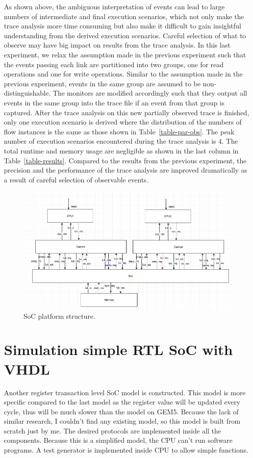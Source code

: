\documentclass[12pt,frontmatter,copyright,thesis]{usfmanus}
\begin{document}
As shown above, the ambiguous interpretation of events can lead to large numbers of intermediate and final execution scenarios, which not only make the trace analysis more time consuming but also make it difficult to gain insightful understanding from the derived execution scenarios.  Careful selection of what to observe may have big impact on results from the trace analysis.  In this last experiment, we relax the assumption made in the previous experiment such that the events passing each link are partitioned into two groups, one for read operations and one for write operations.  Similar to the assumption made in the previous experiment, events in the same group are assumed to be non-distinguishable.  The monitors are modified accordingly such that they output all events in the same group into the trace file if an event from that group is captured.  After the trace analysis on this new partially observed trace is finished, only one execution scenario is derived where the distribution of the numbers of flow instances is the same as those shown in Table~\ref{table-par-obs}.  The peak number of execution scenarios encountered during the trace analysis is $4$.  The total runtime and memory usage are negligible as shown in the last column in Table~\ref{table-results}.  Compared to the results from the previous experiment, the precision and the performance of the trace analysis are improved dramatically as a result of careful selection of observable events. 


\begin{figure} 
\centerline{
\includegraphics[width=7in]{struc.pdf}}
\caption{SoC platform structure.}
\label{rtlstruc}
\end{figure}


\section{Simulation simple RTL SoC with VHDL}
Another register transaction level SoC model is constructed. This model is more specific compared to the last model as the register value will be updated every cycle, thus will be much slower than the model on GEM5. Because the lack of similar research, I couldn't find any existing model, so this model is built from scratch just by me. The desired protocols are implemented inside all the components. Because this is a simplified model, the CPU can't run software programs. A test generator is implemented inside CPU to allow simple functions.
\end{document}
